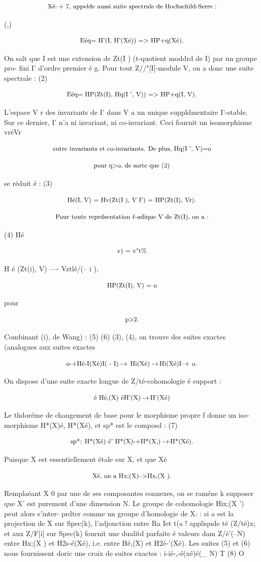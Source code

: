 \documentclass[11pt]{article}
\theoremstyle{remark}
\begin{document}
\[\text{\small Xé--+ 7, appelde aussi suite spectrale de Hochschild-Serre :}\]

(,)

\[\text{\small Eéq= H'(I, H'(Xé)) => HP+q(Xé).}\]

On salt que I est une extension de Zt(I ) (t-quotient moddrd de I) par un groupe pro- fini I' d'ordre premier é g. Pour tout Z//"[I]-module V, on a donc une suite spectrale : (2)

\[\text{\small Eéq= HP(Zt(I), Hq(I ', V)) => HP+q(I, V).}\]

L'espace V r des invariants de I' dans V a un unique suppldmentaire I'-stable. Sur ce dernier, I' n'a ni invariant, ni co-invariant. Ceci fournit un isomorphisme vréVr

\[\text{\small entre invariants et co-invariants. De plus, Hq(I ', V)=o}\]

\[\text{\small pour q>o, de sorte que (2)}\]

se réduit é : (3)

\[\text{\small Hé(I, V) = Hv(Zt(I ), V I') = HP(Zt(I), Vr).}\]

\[\text{\small Pour toute reprdsentation \(\ell\)-adique V de Zt(I), on a :}\]

(4) Hé

\[\text{\small v) = v"t\%}\]

H é (Zt(i), V) ---- Vztlé/(-- i ),

\[\text{\small HP(Zt(I), V) = o}\]

pour

\[\text{\small p>2.}\]

Combinant (i), de Wang) : (5) (6) (3), (4), on trouve des suites exactes (analogues aux suites exactes

\[\text{\small o-+Hé-I(Xé)I( - I) -+ Hi(Xé) -+Hi(Xé)I--+ o.}\]

On dispose d'une suite exacte longue de Z/té-cohomologie é support :

\[\text{\small é Hé,(X) éH'(X) -+H'(Xé)}\]

Le thdoréme de changement de base pour le morphisme propre f donne un iso- morphisme H*(X)é, H*(Xé), et sp* est le composd : (7)

\[\text{\small sp*: H*(Xé) é' H*(X)-+H*(X,) -+H*(Xé).}\]

Puisque X est essentiellement étale sur X, et que Xé

\[\text{\small Xé, on a Hx;(X)-->Hx,(X ).}\]

Remplaéant X 0 par une de ses composantes connexes, on se raméne k supposer que X' est purement d'une dimension N. Le groupe de cohomologie Hix;(X ') peut alors s'inter- prdter comme un groupe d'homologie de X: : si a est la projection de X sur Spec(k), l'adjonction entre Ra Iet t(a ! appliqude té (Z/té)x; et aux Z/F[i] sur Spec(k) fournit une dualitd parfaite é valeurs dam Z/é'(--N) entre Hx;(X ) et H2s-é(Xé), i.e. entre Hé,(X) et H2é-'(Xé). Les suites (5) et (6) nous fournissent doric une croix de suites exactes : i-ié-,-é(xé)é(\_ N) T (8) O
\end{document}
